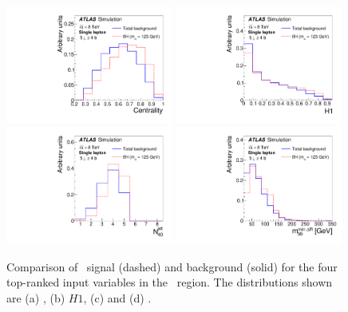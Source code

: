 \begin{figure}[tp]
\begin{center}
\includegraphics[width=0.49\textwidth]{Appendices/Figures_separation/cent_5_sep.pdf}
\includegraphics[width=0.49\textwidth]{Appendices/Figures_separation/H1_5_sep.pdf}\\
\includegraphics[width=0.49\textwidth]{Appendices/Figures_separation/num_jet_40_5_sep.pdf}
\includegraphics[width=0.49\textwidth]{Appendices/Figures_separation/mbb_mindR_5_sep.pdf}
\caption{Comparison of \tth\ signal (dashed) and background (solid) for the four top-ranked input variables in the 
\fivefour\ region.  The distributions shown are (a) \cent, (b) $H1$, (c)  \numjetforty and (d) \mbbmindr.
}
\label{fig:sepinput_lj_1} 
\end{center}
\end{figure}

